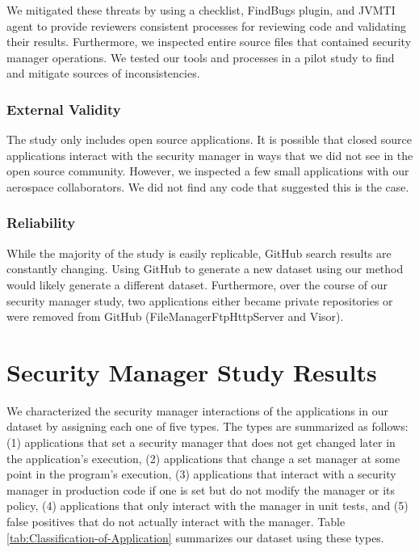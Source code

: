 \documentclass{sig-alternate}
\begin{document}
We mitigated these threats by using a checklist, FindBugs plugin, and JVMTI agent to
provide reviewers consistent processes for reviewing code
and validating their results. Furthermore,
we inspected entire source files that contained
security manager operations. We tested our tools and processes in a pilot study
to find and mitigate sources of inconsistencies.

\subsubsection{External Validity}

The study only includes open source applications. It is possible
that closed source applications interact with the security manager
in ways that we did not see in the open source community. However,
we inspected a few small applications with our aerospace collaborators.
We did not find any code that suggested this is the case. 

\subsubsection{Reliability}

While the majority of the study is easily replicable, GitHub search results are constantly
changing. Using GitHub to generate a new dataset using our method
would likely generate a different dataset. Furthermore, over the course of our security
manager study, two applications either became private repositories
or were removed from GitHub (FileManagerFtpHttpServer and Visor).

\section{Security Manager Study Results}\label{sec:Study-results}

We characterized the security manager interactions of the applications in our dataset by assigning each one of five types. The
types are summarized as follows: (1) applications that set a
security manager that does not get changed later in the application's
execution, (2) applications that change a set manager at some point
in the program's execution, (3) applications that interact with a
security manager in production code if one is set but do not modify the manager or its policy, (4) applications
that only interact with the manager in unit tests, and (5) false positives
that do not actually interact with the manager. Table \ref{tab:Classification-of-Application}
summarizes our dataset using these types.
\end{document}

